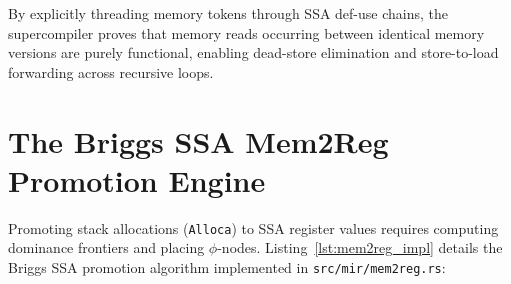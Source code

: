 By explicitly threading memory tokens through SSA def-use chains, the supercompiler proves that memory reads occurring between identical memory versions are purely functional, enabling dead-store elimination and store-to-load forwarding across recursive loops.

\section{The Briggs SSA Mem2Reg Promotion Engine}
\label{sec:ir:mem2reg_impl}

Promoting stack allocations (\texttt{Alloca}) to SSA register values requires computing dominance frontiers and placing $\phi$-nodes. Listing~\ref{lst:mem2reg_impl} details the Briggs SSA promotion algorithm implemented in \texttt{src/mir/mem2reg.rs}:

